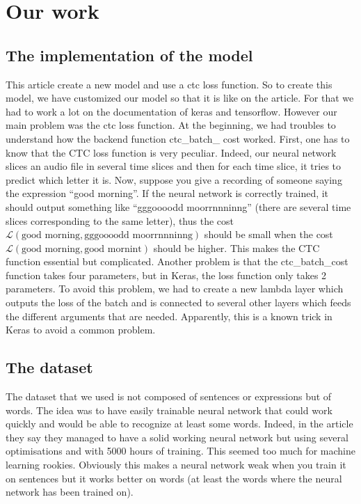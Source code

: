 \documentclass[12pt]{article}
\begin{document}
\section{Our work}

\subsection{The implementation of the model}

This article \cite{article} create a new model and use a ctc loss function. So to create this model, we have customized our model so that it is like on the article. For that we had to work a lot on the documentation of keras and tensorflow. However our main problem was the ctc loss function. At the beginning, we had troubles to understand how the backend function ctc\_batch\_ cost worked. First, one has to know that the CTC loss function is very peculiar. Indeed, our neural network slices an audio file in several time slices and then for each time slice, it tries to predict which letter it is. Now, suppose you give a recording of someone saying the expression ``good morning''. If the neural network is correctly trained, it should output something like ``gggoooodd moorrnnninng'' (there are several time slices corresponding to the same letter), thus the cost $\mathcal{L}(\mbox{good morning}, \mbox{gggoooodd moorrnnninng})$ should be small when the cost $\mathcal{L}(\mbox{good morning}, \mbox{good mornint})$ should be higher. This makes the CTC function essential but complicated. Another problem is that the ctc\_batch\_cost function takes four parameters, but in Keras, the loss function only takes 2 parameters. To avoid this problem, we had to create a new lambda layer which outputs the loss of the batch and is connected to several other layers which feeds the different arguments that are needed. Apparently, this is a known trick in Keras to avoid a common problem.

\subsection{The dataset}

The dataset that we used is not composed of sentences or expressions but of words. The idea was to have easily trainable neural network that could work quickly and would be able to recognize at least some words. Indeed, in the article they say they managed to have a solid working neural network but using several optimisations and with 5000 hours of training. This seemed too much for machine learning rookies. Obviously this makes a neural network weak when you train it on sentences but it works better on words (at least the words where the neural network has been trained on).




\end{document}
